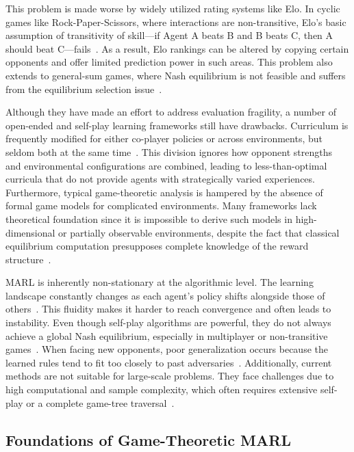 \documentclass[sigconf,anonymous]{aamas}
\begin{document}
This problem is made worse by widely utilized rating systems like Elo. In cyclic games like Rock-Paper-Scissors, where interactions are non-transitive, Elo's basic assumption of transitivity of skill—if Agent A beats B and B beats C, then A should beat C—fails~\cite{Zhang2024Survey}. As a result, Elo rankings can be altered by copying certain opponents and offer limited prediction power in such areas. This problem also extends to general-sum games, where Nash equilibrium is not feasible and suffers from the equilibrium selection issue~\cite{Zhang2023ModelBased}.

Although they have made an effort to address evaluation fragility, a number of open-ended and self-play learning frameworks still have drawbacks. Curriculum is frequently modified for either co-player policies or across environments, but seldom both at the same time~\cite{Sokota2024}. This division ignores how opponent strengths and environmental configurations are combined, leading to less-than-optimal curricula that do not provide agents with strategically varied experiences. Furthermore, typical game-theoretic analysis is hampered by the absence of formal game models for complicated environments. Many frameworks lack theoretical foundation since it is impossible to derive such models in high-dimensional or partially observable environments, despite the fact that classical equilibrium computation presupposes complete knowledge of the reward structure~\cite{Zhang2023ModelBased}.

MARL is inherently non-stationary at the algorithmic level. The learning landscape constantly changes as each agent's policy shifts alongside those of others~\cite{Ellis2023}. This fluidity makes it harder to reach convergence and often leads to instability. Even though self-play algorithms are powerful, they do not always achieve a global Nash equilibrium, especially in multiplayer or non-transitive games~\cite{Omidshafiei2019,Balduzzi2019}. When facing new opponents, poor generalization occurs because the learned rules tend to fit too closely to past adversaries~\cite{Balduzzi2019}. Additionally, current methods are not suitable for large-scale problems. They face challenges due to high computational and sample complexity, which often requires extensive self-play or a complete game-tree traversal~\cite{Wang2024}.

\subsection{Foundations of Game-Theoretic MARL}
\end{document}
